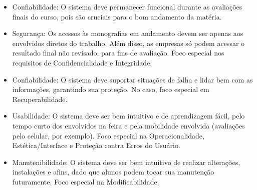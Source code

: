 \begin{itemize}
    \item Confiabilidade: O sistema deve permanecer funcional durante as avaliações finais do curso, pois são cruciais para o bom andamento da matéria.
    \item Segurança: Os acessos às monografias em andamento devem ser apenas aos envolvidos diretos do trabalho. Além disso, as empresas só podem acessar o resultado final não revisado, para fins de avaliação. Foco especial nos requisitos de Confidencialidade e Integridade.
    \item Confiabilidade: O sistema deve suportar situações de falha e lidar bem com as informações, garantindo sua proteção. No caso, foco especial em Recuperabilidade.
    \item Usabilidade: O sistema deve ser bem intuitivo e de aprendizagem fácil, pelo tempo curto dos envolvidos na feira e pela mobilidade envolvida (avaliações pelo celular, por exemplo). Foco especial na Operacionalidade, Estética/Interface e Proteção contra Erros do Usuário.
    \item Manutenibilidade: O sistema deve ser bem intuitivo de realizar alterações, instalações e afins, dado que alunos podem tocar sua manutenção futuramente. Foco especial na Modificabilidade.
\end{itemize}